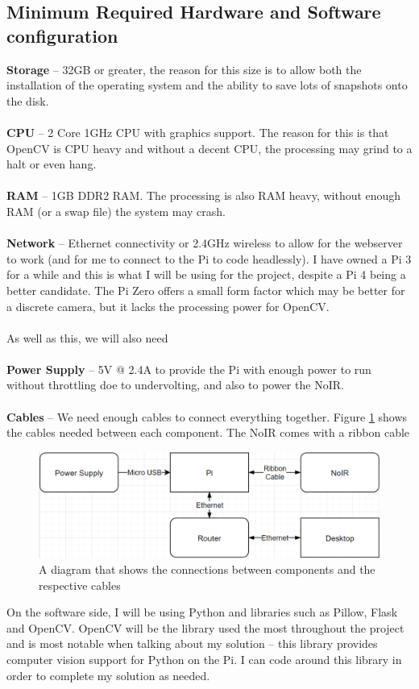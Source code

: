 \documentclass[9pt]{article}
\begin{document}
\subsection{Minimum Required Hardware and Software configuration}\label{sec_hardware}
\textbf{Storage} -- 32GB or greater, the reason for this size is to allow both the installation of the operating system and the ability to save lots of snapshots onto the disk.\\\\
\textbf{CPU} -- 2 Core 1GHz CPU with graphics support. The reason for this is that OpenCV is CPU heavy and without a decent CPU, the processing may grind to a halt or even hang.\\\\
\textbf{RAM} -- 1GB DDR2 RAM. The processing is also RAM heavy, without enough RAM (or a swap file) the system may crash. \\\\
\textbf{Network} -- Ethernet connectivity or 2.4GHz wireless to allow for the webserver to work (and for me to connect to the Pi to code headlessly).
I have owned a Pi 3 for a while and this is what I will be using for the project, despite a Pi 4 being a better candidate. The Pi Zero offers a small form factor which may be better for a discrete camera, but it lacks the processing power for OpenCV.\\\\
As well as this, we will also need\\\\
\textbf{Power Supply} -- 5V @ 2.4A to provide the Pi with enough power to run without throttling doe to undervolting, and also to power the NoIR.\\\\
\textbf{Cables} -- We need enough cables to connect everything together. Figure \ref{fig_raspberryCables} shows the cables needed between each component. The NoIR comes with a ribbon cable
\begin{figure}[H]
	\centering
	\includegraphics[width=4.5in]{raspberryCables.png}
	\caption{A diagram that shows the connections between components and the respective cables}\label{fig_raspberryCables}
\end{figure}
On the software side, I will be using Python and libraries such as Pillow, Flask and OpenCV. OpenCV will be the library used the most throughout the project and is most notable when talking about my solution -- this library provides computer vision support for Python on the Pi. I can code around this library in order to complete my solution as needed.
\newpage
\end{document}
